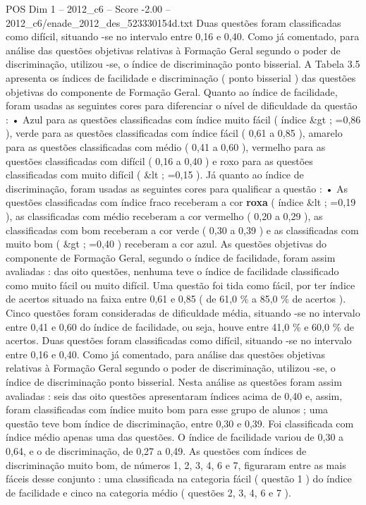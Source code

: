 \begin{textsample}{POS Dim 1 – 2012\_c6 – Score -2.00 – 2012\_c6/enade\_2012\_des\_523330154d.txt}
Duas questões foram classificadas como difícil, situando -se no intervalo entre 0,16 e 0,40.
Como já comentado, para análise das questões objetivas relativas à Formação Geral segundo o poder de discriminação, utilizou -se, o índice de discriminação ponto bisserial.
A Tabela 3.5 apresenta os índices de facilidade e discriminação ( ponto bisserial ) das questões objetivas do componente de Formação Geral.
Quanto ao índice de facilidade, foram usadas as seguintes cores para diferenciar o nível de dificuldade da questão : • Azul para as questões classificadas com índice muito fácil ( índice \&gt ; =0,86 ), verde para as questões classificadas com índice fácil ( 0,61 a 0,85 ), amarelo para as questões classificadas com médio ( 0,41 a 0,60 ), vermelho para as questões classificadas com difícil ( 0,16 a 0,40 ) e roxo para as questões classificadas com muito difícil ( \&lt ; =0,15 ).
Já quanto ao índice de discriminação, foram usadas as seguintes cores para qualificar a questão : • As questões classificadas com índice fraco receberam a cor \textbf{roxa} ( índice \&lt ; =0,19 ), as classificadas com médio receberam a cor vermelho ( 0,20 a 0,29 ), as classificadas com bom receberam a cor verde ( 0,30 a 0,39 ) e as classificadas com muito bom ( \&gt ; =0,40 ) receberam a cor azul.
As questões objetivas do componente de Formação Geral, segundo o índice de facilidade, foram assim avaliadas : das oito questões, nenhuma teve o índice de facilidade classificado como muito fácil ou muito difícil.
Uma questão foi tida como fácil, por ter índice de acertos situado na faixa entre 0,61 e 0,85 ( de 61,0 \% a 85,0 \% de acertos ).
Cinco questões foram consideradas de dificuldade média, situando -se no intervalo entre 0,41 e 0,60 do índice de facilidade, ou seja, houve entre 41,0 \% e 60,0 \% de acertos.
Duas questões foram classificadas como difícil, situando -se no intervalo entre 0,16 e 0,40.
Como já comentado, para análise das questões objetivas relativas à Formação Geral segundo o poder de discriminação, utilizou -se, o índice de discriminação ponto bisserial.
Nesta análise as questões foram assim avaliadas : seis das oito questões apresentaram índices acima de 0,40 e, assim, foram classificadas com índice muito bom para esse grupo de alunos ; uma questão teve bom índice de discriminação, entre 0,30 e 0,39.
Foi classificada com índice médio apenas uma das questões.
O índice de facilidade variou de 0,30 a 0,64, e o de discriminação, de 0,27 a 0,49.
As questões com índices de discriminação muito bom, de números 1, 2, 3, 4, 6 e 7, figuraram entre as mais fáceis desse conjunto : uma classificada na categoria fácil ( questão 1 ) do índice de facilidade e cinco na categoria médio ( questões 2, 3, 4, 6 e 7 ).

\end{textsample}
